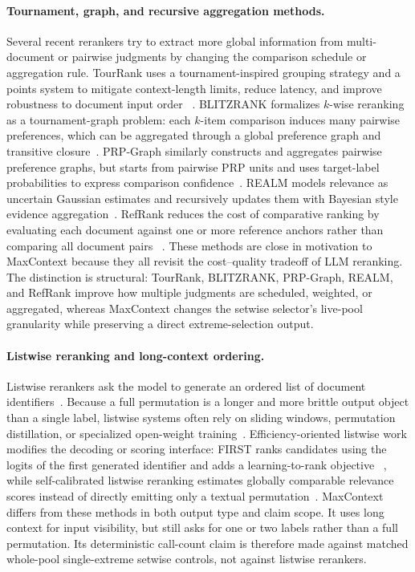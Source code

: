 \paragraph{Tournament, graph, and recursive aggregation methods.}
Several recent rerankers try to extract more global information from
multi-document or pairwise judgments by changing the comparison schedule
or aggregation rule. TourRank uses a tournament-inspired grouping
strategy and a points system to mitigate context-length limits, reduce
latency, and improve robustness to document input order
~\citep{chen2025tourrank}. BLITZRANK formalizes $k$-wise reranking as a
tournament-graph problem: each $k$-item comparison induces many pairwise
preferences, which can be aggregated through a global preference graph
and transitive closure~\citep{agrawal2026blitzrank}. PRP-Graph similarly
constructs and aggregates pairwise preference graphs, but starts from
pairwise PRP units and uses target-label probabilities to express
comparison confidence~\citep{luo2024prpgraph}. REALM models relevance as
uncertain Gaussian estimates and recursively updates them with Bayesian
style evidence aggregation~\citep{wang2025realm}. RefRank reduces the
cost of comparative ranking by evaluating each document against one or
more reference anchors rather than comparing all document pairs
~\citep{li2025refrank}. These methods are close in motivation to
MaxContext because they all revisit the cost--quality tradeoff of LLM
reranking. The distinction is structural: TourRank, BLITZRANK,
PRP-Graph, REALM, and RefRank improve how multiple judgments are
scheduled, weighted, or aggregated, whereas MaxContext changes the
setwise selector's live-pool granularity while preserving a direct
extreme-selection output.

\paragraph{Listwise reranking and long-context ordering.}
Listwise rerankers ask the model to generate an ordered list of document
identifiers~\citep{sun2023rankgpt,ma2023zeroshotlistwise,
pradeep2023rankvicuna,pradeep2023rankzephyr}. Because a full permutation
is a longer and more brittle output object than a single label, listwise
systems often rely on sliding windows, permutation distillation, or
specialized open-weight training~\citep{sun2023rankgpt,
zhang2025rankwithoutgpt}. Efficiency-oriented listwise work modifies the
decoding or scoring interface: FIRST ranks candidates using the logits
of the first generated identifier and adds a learning-to-rank objective
~\citep{reddy2024first}, while self-calibrated listwise reranking
estimates globally comparable relevance scores instead of directly
emitting only a textual permutation~\citep{ren2025selfcalibrated}.
MaxContext differs from these methods in both output type and claim
scope. It uses long context for input visibility, but still asks for one
or two labels rather than a full permutation. Its deterministic
call-count claim is therefore made against matched whole-pool
single-extreme setwise controls, not against listwise rerankers.

